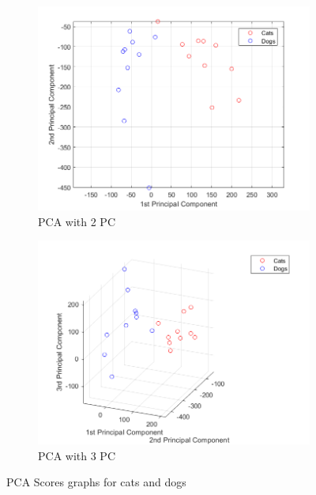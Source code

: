 \documentclass[a4paper]{iacas}
\begin{document}
\vskip 0.1in
\begin{figure}[!htbp]
	\begin{subfigure}{0.8\linewidth}
		\centering
		\includegraphics[width=\linewidth]{imgs/scatter_2d_pca.png}
		\caption{PCA with 2 PC}
	\end{subfigure}
	\vskip 0.1in
	\begin{subfigure}{0.8\linewidth}
		\centering
		\includegraphics[width=\linewidth]{imgs/scatter_3d_pca.png}
		\caption{PCA with 3 PC}
	\end{subfigure}
	\caption{PCA Scores graphs for cats and dogs}
	\label{PC_graphs}
\end{figure}
\vskip 0.1in
\end{document}
